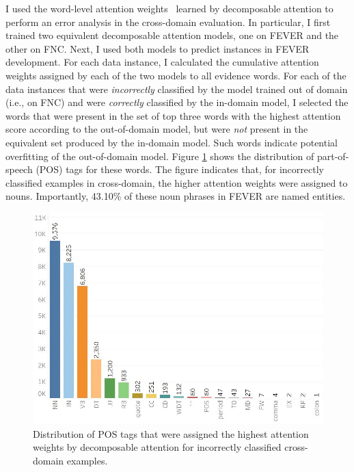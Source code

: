\documentclass{article}
\begin{document}
I used the word-level attention weights~\citep*{bahdanau2014neural} learned by decomposable attention to perform  an error analysis in the cross-domain evaluation. 
In particular, I first trained two equivalent decomposable attention models, one on FEVER and the other on FNC. 
Next, I used both models to predict instances in FEVER development. For each data instance, I calculated the cumulative attention weights assigned by each of the two models to all evidence words. 
For each of the data instances that were {\em incorrectly} classified by the model trained out of domain (i.e., on FNC) and were {\em correctly} classified by the in-domain model, 
I  selected the words that were present in the set of top three words with the highest attention score according to the out-of-domain model, but were {\em not} present in the equivalent set produced by the in-domain model. Such words indicate potential overfitting of the out-of-domain model. 
Figure \ref{fig:attention} shows the distribution of part-of-speech (POS) tags for these words. The figure indicates that, for incorrectly classified examples in cross-domain, the higher attention weights were assigned to nouns.
Importantly, 43.10\% of these noun phrases in FEVER are named entities. 



\begin{figure}
 \includegraphics[width=0.95\linewidth]{histogram_2.jpg}
    \vspace{-3mm}
    \caption{ Distribution of POS tags that were assigned the highest attention weights by decomposable attention for incorrectly classified cross-domain examples.}
  \label{fig:attention}
\vspace{-6mm}
\end{figure}
\end{document}
